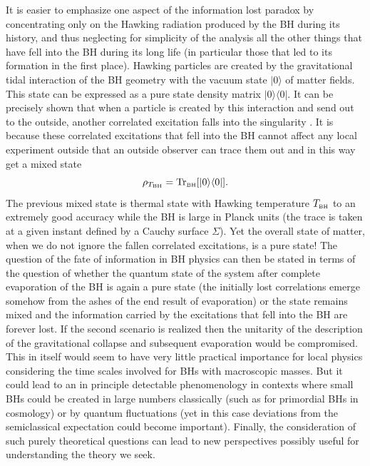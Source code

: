 \documentclass[aps, nofootinbib,superscriptaddress,12pt]{revtex4-2}
\newcommand{\va}{\scriptscriptstyle}
\def\be{\begin{equation}}
\def\ee{\end{equation}}
\begin{document}
It is easier to emphasize one aspect of the information lost paradox by concentrating only on the Hawking radiation produced by the BH during its history, and thus neglecting for simplicity of the analysis all the other things that have fell into the BH during its long life (in particular those that led to its formation in the first place).
Hawking particles are created by the gravitational tidal interaction of the BH geometry with the vacuum state $|0\rangle$ of matter fields. This state can be expressed as a  pure state density matrix $|0\rangle\langle 0|$. It can be precisely shown that when a particle is created by this interaction and send out to the outside, another correlated excitation falls into the singularity \cite{Wald:1975kc, Hawking:1974sw, Hotta:2015yla}. It is because these correlated excitations that fell into the BH cannot affect any local experiment outside that an outside observer can trace them out and in this way get a mixed state
\be
\rho_{T_{\va \rm BH}}={\rm Tr}_{\rm \va BH}[|0\rangle\langle 0|].\ee
The previous mixed state is thermal state with Hawking temperature $T_{\rm \va BH}$ to an extremely good accuracy while the BH is large in Planck units (the trace is taken at a given instant defined by a Cauchy surface $\Sigma$). Yet the overall state of matter, when we do not ignore the fallen correlated excitations, is a pure state! The question of the fate of information in BH physics can then be stated in terms of the question of whether the quantum state of the system after complete evaporation of the BH is again a pure state (the initially lost correlations emerge somehow from the ashes of the end result of evaporation) or the state remains mixed and the information carried by the excitations that fell into the BH are forever lost. If the second scenario is realized then the unitarity of the description of the gravitational collapse and subsequent evaporation would be compromised.
This in itself would seem to have very little practical importance for local physics considering the time scales involved for BHs with macroscopic masses. But it could lead to an in principle detectable phenomenology in contexts where small BHs could be created in large numbers classically (such as for primordial BHs in cosmology) or by quantum fluctuations (yet in this case deviations from the semiclassical expectation could become important). Finally, the consideration of such purely theoretical questions can lead to new perspectives possibly useful for understanding the theory we seek.
\end{document}
